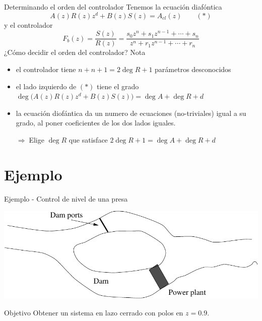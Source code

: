 \documentclass[presentation,aspectratio=169]{beamer}
\begin{document}
\begin{frame}[label={sec:org6c36087}]{Determinando el orden del controlador}
Tenemos la ecuación diafóntica
   \[ A(z)R(z)z^{d} + B(z)S(z) = A_{cl}(z) \qquad (*) \]
y el controlador
\[F_b(z) = \frac{S(z)}{R(z)} = \frac{s_0z^n + s_1z^{n-1} + \cdots + s_n}{z^n + r_1 z^{n-1} + \cdots + r_n}\]
\alert{¿Cómo decidir el orden del controlador?} Nota
\begin{itemize}
\item el controlador tiene \(n+n+1 = 2\deg R + 1\) parámetros desconocidos
\item el lado izquierdo de \((*)\) tiene el grado \(\deg \big(A(z)R(z)z^d + B(z)S(z)\big) = \deg A + \deg R + d\)
\item la ecuación diofántica da un numero de ecuaciones (no-triviales) igual a su grado, al poner coeficientes de los dos lados iguales.

\alert{\(\Rightarrow\;\)Elige \(\deg R\) que satisface \(2\deg R + 1 = \deg A + \deg R + d\)}
\end{itemize}
\end{frame}


\section{Ejemplo}
\label{sec:org7994b02}
\begin{frame}[label={sec:org2b1ef95}]{Ejemplo - Control de nivel de una presa}
\begin{center}
\includegraphics[width=0.5\linewidth]{../../figures/kraftverk}
\end{center}

\alert{Objetivo} Obtener un sistema en lazo cerrado con polos en \(z=0.9\).
\end{frame}
\end{document}
